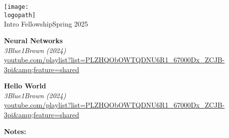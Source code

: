 \documentclass[12pt]{article}
\def\logopath{../assets/caiac_logo.png}
\begin{document}
\thispagestyle{empty} %

\begin{center}
    \texttt{[image: \\logopath]}\\
    \vspace{0.2em}
    {\color{primaryFaded}Intro Fellowship\color{primaryFaded}Spring 2025}
\end{center}

\vspace{1em}

\noindent\textbf{Neural Networks}\\
\textit{3Blue1Brown (2024)}\\
{\small \url{youtube.com/playlist?list=PLZHQObOWTQDNU6R1_67000Dx_ZCJB-3pi&amp;feature=shared}}

\vspace{1em}
\noindent\textbf{Hello World}\\
\textit{3Blue1Brown (2024)}\\
{\small \url{youtube.com/playlist?list=PLZHQObOWTQDNU6R1_67000Dx_ZCJB-3pi&amp;feature=shared}}

\vspace{1em}

\textbf{Notes:}

\vspace{4em}
\end{document}
